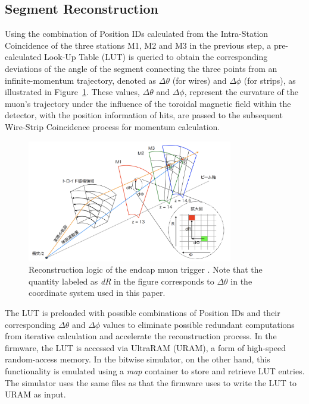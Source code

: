\subsection{Segment Reconstruction} \label{subsec:SegRec}
Using the combination of Position IDs calculated from the Intra-Station Coincidence of the three stations M1, M2 and M3 in the previous step, a pre-calculated Look-Up Table (LUT) is queried to obtain the corresponding deviations of the angle of the segment connecting the three points from an infinite-momentum trajectory, denoted as $\Delta\theta$ (for wires) and $\Delta\phi$ (for strips), as illustrated in Figure~\ref{fig:EndcapTriggerLogic}. These values, $\Delta\theta$ and $\Delta\phi$, represent the curvature of the muon’s trajectory under the influence of the toroidal magnetic field within the detector, with the position information of hits, are passed to the subsequent Wire-Strip Coincidence process for momentum calculation.

\begin{figure}[htbp]
  \centering
  \includegraphics[width=0.8\textwidth]{figs/chapter5/endcap_trigger_logic_concept.png}
  \caption{Reconstruction logic of the endcap muon trigger \cite{akatsuka}. Note that the quantity labeled as \textit{dR} in the figure corresponds to $\Delta\theta$ in the coordinate system used in this paper.}
  \label{fig:EndcapTriggerLogic}
\end{figure}

The LUT is preloaded with possible combinations of Position IDs and their corresponding $\Delta\theta$ and $\Delta\phi$ values to eliminate possible redundant computations from iterative calculation and accelerate the reconstruction process. In the firmware, the LUT is accessed via UltraRAM (URAM), a form of high-speed random-access memory. In the bitwise simulator, on the other hand, this functionality is emulated using a \textit{map} container to store and retrieve LUT entries. The simulator uses the same files as that the firmware uses to write the LUT to URAM as input.

